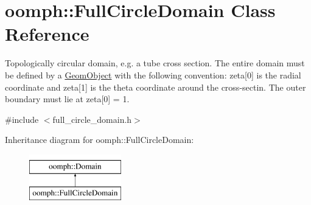 \hypertarget{classoomph_1_1FullCircleDomain}{}\section{oomph\+:\+:Full\+Circle\+Domain Class Reference}
\label{classoomph_1_1FullCircleDomain}


Topologically circular domain, e.\+g. a tube cross section. The entire domain must be defined by a \hyperlink{classoomph_1_1GeomObject}{Geom\+Object} with the following convention\+: zeta\mbox{[}0\mbox{]} is the radial coordinate and zeta\mbox{[}1\mbox{]} is the theta coordinate around the cross-\/sectin. The outer boundary must lie at zeta\mbox{[}0\mbox{]} = 1.  




{\ttfamily \#include $<$full\+\_\+circle\+\_\+domain.\+h$>$}

Inheritance diagram for oomph\+:\+:Full\+Circle\+Domain\+:\begin{figure}[H]
\begin{center}
\leavevmode
\includegraphics[height=2.000000cm]{classoomph_1_1FullCircleDomain}
\end{center}
\end{figure}
